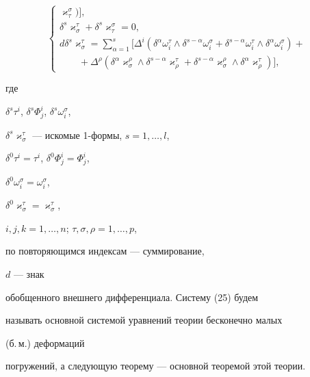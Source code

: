 \begin{equation}
\begin{cases}
\varkappa^{\sigma}_{\tau})],\\


%


\delta^s\varkappa^{\tau}_{\sigma}+\delta^s\varkappa^{\sigma}_{\tau}=0,\\


%


d\delta^s\varkappa^{\tau}_{\sigma}=\sum\limits_{\alpha=1}^{s}[\Delta^i(


\delta^{\alpha}\omega^{\tau}_i\wedge\delta^{s-\alpha}


\omega^{\sigma}_i+


\delta^{s-\alpha}\omega^{\tau}_i\wedge\delta^{\alpha}


\omega^{\sigma}_i)+\\


%


\qquad+\Delta^{\rho}(


\delta^{\alpha}\varkappa^{\rho}_{\sigma}\wedge\delta^{s-\alpha}


\varkappa^{\tau}_{\rho}+


\delta^{s-\alpha}\varkappa^{\rho}_{\sigma}\wedge\delta^{\alpha}


\varkappa^{\tau}_{\rho})],


\end{cases}


\end{equation}


где


$\delta^s\tau^i$, $\delta^s\Phi^i_j$, $\delta^s\omega^{\sigma}_i$,


$\delta^s\varkappa^{\tau}_{\sigma}$ --- искомые 1-формы, $s=1,\dotsc,l$,


$\delta^0\tau^i=\tau^i$, $\delta^0\Phi^i_j=\Phi^i_j$,


$\delta^0\omega^{\sigma}_i=\omega^{\sigma}_i$,


$\delta^0\varkappa^{\tau}_{\sigma}=\varkappa^{\tau}_{\sigma}$,


$i,j,k=1,\dotsc,n$; $\tau,\sigma,\rho=1,\dotsc,p$,


по повторяющимся индексам --- суммирование,


$d$ --- знак


обобщенного внешнего дифференциала. Систему (25) будем


называть основной системой уравнений теории бесконечно малых


(б.\,м.) деформаций


погружений, а следующую теорему --- основной теоремой этой теории.





